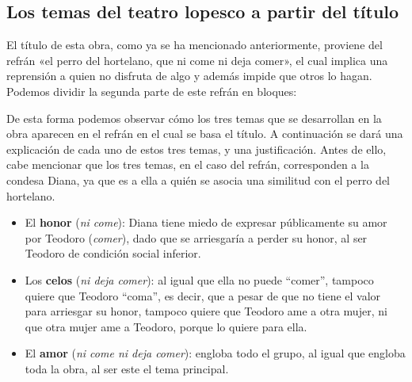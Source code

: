 \documentclass[12pt,a4paper]{article}
\begin{document}
\subsection{Los temas del teatro lopesco a partir del título}

El título de esta obra, como ya se ha mencionado anteriormente, proviene del refrán «el perro del hortelano, que ni come ni deja comer», el cual implica una reprensión a quien no disfruta de algo y además impide que otros lo hagan. Podemos dividir la segunda parte de este refrán en bloques:\\

\begin{figure}[h]
	\centering
\end{figure}

De esta forma podemos observar cómo los tres temas que se desarrollan en la obra aparecen en el refrán en el cual se basa el título. A continuación se dará una explicación de cada uno de estos tres temas, y una justificación. Antes de ello, cabe mencionar que los tres temas, en el caso del refrán, corresponden a la condesa Diana, ya que es a ella a quién se asocia una similitud con el perro del hortelano.

\begin{itemize}
	\item El \textbf{honor} (\textit{ni come}): Diana tiene miedo de expresar públicamente su amor por Teodoro (\textit{comer}), dado que se arriesgaría a perder su honor, al ser Teodoro de condición social inferior.
	\item Los \textbf{celos} (\textit{ni deja comer}): al igual que ella no puede ``comer'', tampoco quiere que Teodoro ``coma'', es decir, que a pesar de que no tiene el valor para arriesgar su honor, tampoco quiere que Teodoro ame a otra mujer, ni que otra mujer ame a Teodoro, porque lo quiere para ella.
	\item El \textbf{amor} (\textit{ni come ni deja comer}): engloba todo el grupo, al igual que engloba toda la obra, al ser este el tema principal.
\end{itemize}
\end{document}
